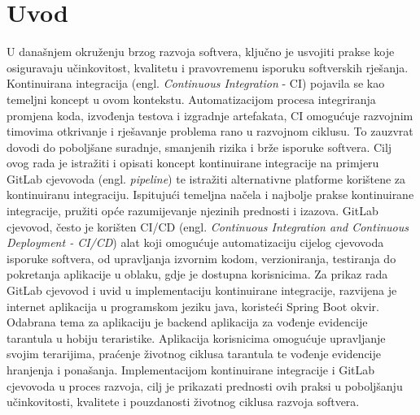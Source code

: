 \documentclass[a4paper,12pt,oneside]{article}
\begin{document}



%
%





{
	\hypersetup{linkcolor=black}
	\tableofcontents
}

\onehalfspace

\newpage
\section{Uvod}

U današnjem okruženju brzog razvoja softvera, ključno je usvojiti prakse koje osiguravaju učinkovitost, kvalitetu i pravovremenu isporuku softverskih rješanja. Kontinuirana integracija (engl. \textit{Continuous Integration} - CI) pojavila se kao temeljni koncept u ovom kontekstu. Automatizacijom procesa integriranja promjena koda, izvođenja testova i izgradnje artefakata, CI omogućuje razvojnim timovima otkrivanje i rješavanje problema rano u razvojnom ciklusu. To zauzvrat dovodi do poboljšane suradnje, smanjenih rizika i brže isporuke softvera.
Cilj ovog rada je istražiti i opisati koncept kontinuirane integracije na primjeru GitLab cjevovoda (engl. \textit{pipeline}) te istražiti alternativne platforme korištene za kontinuiranu integraciju. Ispitujući temeljna načela i najbolje prakse kontinuirane integracije, pružiti opće razumijevanje njezinih prednosti i izazova. GitLab cjevovod, često je korišten CI/CD (engl. \textit{Continuous Integration and Continuous Deployment - CI/CD}) alat koji omogućuje automatizaciju cijelog cjevovoda isporuke softvera, od upravljanja izvornim kodom, verzioniranja, testiranja do pokretanja aplikacije u oblaku, gdje je dostupna korisnicima.
Za prikaz rada GitLab cjevovod i uvid u implementaciju kontinuirane integracije, razvijena je internet aplikacija u programskom jeziku java, koristeći Spring Boot okvir. Odabrana tema za aplikaciju je backend aplikacija za vođenje evidencije tarantula u hobiju teraristike. Aplikacija korisnicima omogućuje upravljanje svojim terarijima, praćenje životnog ciklusa tarantula te vođenje evidencije hranjenja i ponašanja. Implementacijom kontinuirane integracije i GitLab cjevovoda u proces razvoja, cilj je prikazati prednosti ovih praksi u poboljšanju učinkovitosti, kvalitete i pouzdanosti životnog ciklusa razvoja softvera.
\end{document}
